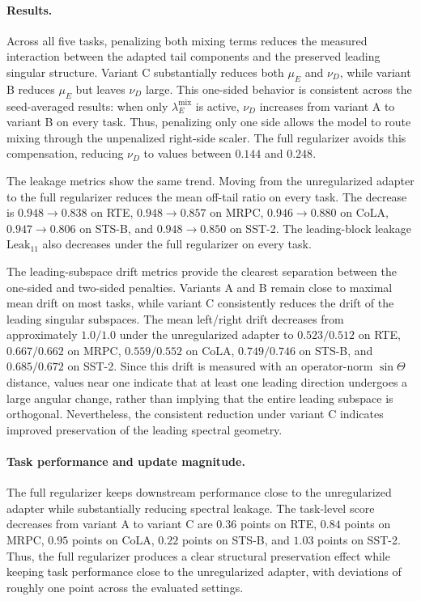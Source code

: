 \paragraph{Results.}
Across all five tasks, penalizing both mixing terms reduces the measured
interaction between the adapted tail components and the preserved leading
singular structure. Variant C substantially reduces both \(\mu_E\) and
\(\nu_D\), while variant B reduces \(\mu_E\) but leaves \(\nu_D\) large. This
one-sided behavior is consistent across the seed-averaged results: when only
\(\lambda_E^{\mathrm{mix}}\) is active, \(\nu_D\) increases from variant A to
variant B on every task. Thus, penalizing only one side allows the model to
route mixing through the unpenalized right-side scaler. The full regularizer
avoids this compensation, reducing \(\nu_D\) to values between \(0.144\) and
\(0.248\).

The leakage metrics show the same trend. Moving from the unregularized adapter
to the full regularizer reduces the mean off-tail ratio on every task. The
decrease is \(0.948 \rightarrow 0.838\) on RTE,
\(0.948 \rightarrow 0.857\) on MRPC,
\(0.946 \rightarrow 0.880\) on CoLA,
\(0.947 \rightarrow 0.806\) on STS-B, and
\(0.948 \rightarrow 0.850\) on SST-2. The leading-block leakage
\(\mathrm{Leak}_{11}\) also decreases under the full regularizer on every task.

The leading-subspace drift metrics provide the clearest separation between the
one-sided and two-sided penalties. Variants A and B remain close to maximal
mean drift on most tasks, while variant C consistently reduces the drift of the
leading singular subspaces. The mean left/right drift decreases from
approximately \(1.0/1.0\) under the unregularized adapter to \(0.523/0.512\)
on RTE, \(0.667/0.662\) on MRPC, \(0.559/0.552\) on CoLA, \(0.749/0.746\) on
STS-B, and \(0.685/0.672\) on SST-2. Since this drift is measured with an
operator-norm \(\sin\Theta\) distance, values near one indicate that at least
one leading direction undergoes a large angular change, rather than implying
that the entire leading subspace is orthogonal. Nevertheless, the consistent
reduction under variant C indicates improved preservation of the leading
spectral geometry.

\paragraph{Task performance and update magnitude.}
The full regularizer keeps downstream performance close to the unregularized
adapter while substantially reducing spectral leakage. The task-level score
decreases from variant A to variant C are \(0.36\) points on RTE, \(0.84\)
points on MRPC, \(0.95\) points on CoLA, \(0.22\) points on STS-B, and
\(1.03\) points on SST-2. Thus, the full regularizer produces a clear
structural preservation effect while keeping task performance close to the
unregularized adapter, with deviations of roughly one point across the
evaluated settings.

